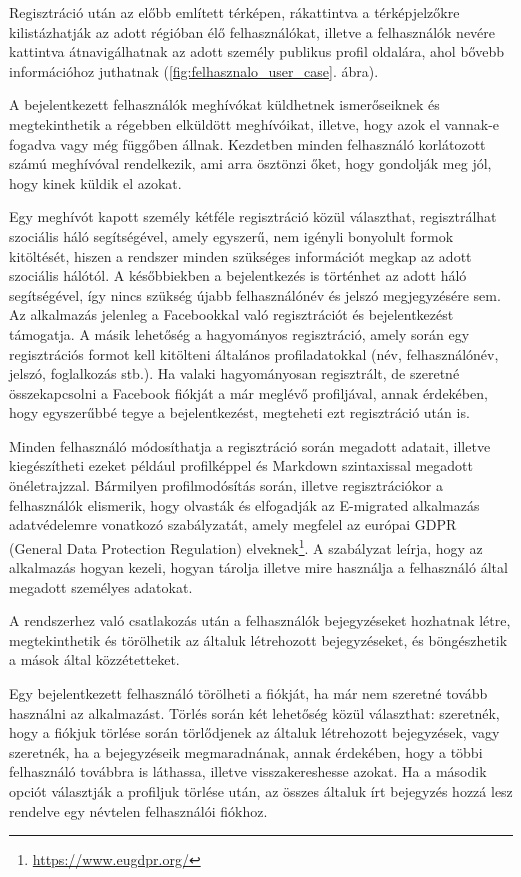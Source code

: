 Regisztráció után az előbb említett térképen, rákattintva a térképjelzőkre kilistázhatják az adott régióban élő felhasználókat, illetve a felhasználók nevére kattintva átnavigálhatnak az adott személy publikus profil oldalára, ahol bővebb információhoz juthatnak (\ref{fig:felhasznalo_user_case}. ábra). 

A bejelentkezett felhasználók meghívókat küldhetnek ismerőseiknek és megtekinthetik a régebben elküldött meghívóikat, illetve, hogy azok el vannak-e fogadva vagy még függőben állnak. Kezdetben minden felhasználó korlátozott számú meghívóval rendelkezik, ami arra ösztönzi őket, hogy gondolják meg jól, hogy kinek küldik el azokat.

Egy meghívót kapott személy kétféle regisztráció közül választhat, regisztrálhat szociális háló segítségével, amely egyszerű, nem igényli bonyolult formok kitöltését, hiszen a rendszer minden szükséges információt megkap az adott szociális hálótól. A későbbiekben a bejelentkezés is történhet az adott háló segítségével, így nincs szükség újabb felhasználónév és jelszó megjegyzésére sem. Az alkalmazás jelenleg a Facebookkal való regisztrációt és bejelentkezést támogatja. A másik lehetőség a hagyományos regisztráció, amely során egy regisztrációs formot kell kitölteni általános profiladatokkal (név, felhasználónév, jelszó, foglalkozás stb.). Ha valaki hagyományosan regisztrált, de szeretné összekapcsolni a Facebook fiókját a már meglévő profiljával, annak érdekében, hogy egyszerűbbé tegye a bejelentkezést, megteheti ezt regisztráció után is. 

Minden felhasználó módosíthatja a regisztráció során megadott adatait, illetve kiegészítheti ezeket például profilképpel és Markdown szintaxissal megadott önéletrajzzal. Bármilyen profilmodósítás során, illetve regisztrációkor a felhasználók elismerik, hogy olvasták és elfogadják az E-migrated alkalmazás adatvédelemre vonatkozó szabályzatát, amely megfelel az európai GDPR (General Data Protection Regulation) elveknek\footnote{\url{https://www.eugdpr.org/}}. A szabályzat leírja, hogy az alkalmazás hogyan kezeli, hogyan tárolja illetve mire használja a felhasználó által megadott személyes adatokat.

A rendszerhez való csatlakozás után a felhasználók bejegyzéseket hozhatnak létre, megtekinthetik és törölhetik az általuk létrehozott bejegyzéseket, és böngészhetik a mások által közzétetteket. 

Egy bejelentkezett felhasználó törölheti a fiókját, ha már nem szeretné tovább használni az alkalmazást. Törlés során két lehetőség közül választhat: szeretnék, hogy a fiókjuk törlése során törlődjenek az általuk létrehozott bejegyzések, vagy szeretnék, ha a bejegyzéseik megmaradnának, annak érdekében, hogy a többi felhasználó továbbra is láthassa, illetve visszakereshesse azokat. Ha a második opciót választják a profiljuk törlése után, az összes általuk írt bejegyzés hozzá lesz rendelve egy névtelen felhasználói fiókhoz.


